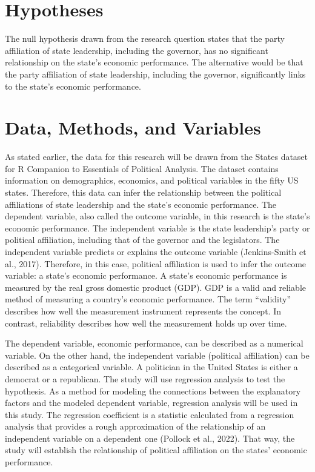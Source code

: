 \documentclass[11pt]{article}
\begin{document}
\section{Hypotheses}

The null hypothesis drawn from the research question states that the party affiliation of state leadership, including the governor, has no significant relationship on the state's economic performance. The alternative would be that the party affiliation of state leadership, including the governor, significantly links to the state's economic performance.

\section{Data, Methods, and Variables}

As stated earlier, the data for this research will be drawn from the States dataset for R Companion to Essentials of Political Analysis. The dataset contains information on demographics, economics, and political variables in the fifty US states. Therefore, this data can infer the relationship between the political affiliations of state leadership and the state's economic performance. The dependent variable, also called the outcome variable, in this research is the state's economic performance. The independent variable is the state leadership's party or political affiliation, including that of the governor and the legislators. The independent variable predicts or explains the outcome variable (Jenkins-Smith et al., 2017). Therefore, in this case, political affiliation is used to infer the outcome variable: a state's economic performance. A state's economic performance is measured by the real gross domestic product (GDP). GDP is a valid and reliable method of measuring a country's economic performance. The term “validity” describes how well the measurement instrument represents the concept. In contrast, reliability describes how well the measurement holds up over time.

The dependent variable, economic performance, can be described as a numerical variable. On the other hand, the independent variable (political affiliation) can be described as a categorical variable. A politician in the United States is either a democrat or a republican. The study will use regression analysis to test the hypothesis. As a method for modeling the connections between the explanatory factors and the modeled dependent variable, regression analysis will be used in this study. The regression coefficient is a statistic calculated from a regression analysis that provides a rough approximation of the relationship of an independent variable on a dependent one (Pollock et al., 2022). That way, the study will establish the relationship of political affiliation on the states' economic performance.
\end{document}
